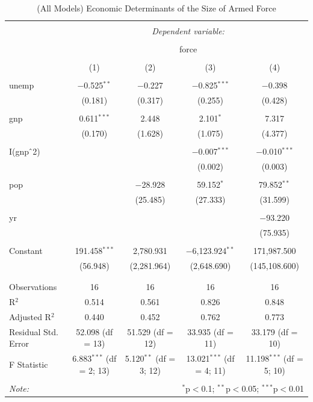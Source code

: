 \documentclass[11pt,]{article}
\begin{document}
\begin{table}[!htbp] \centering 
  \caption{(All Models) Economic Determinants of the Size of Armed Force} 
  \label{tab:arm1} 
\begin{tabular}{@{\extracolsep{5pt}}lcccc} 
\\[-1.8ex]\hline 
\hline \\[-1.8ex] 
 & \multicolumn{4}{c}{\textit{Dependent variable:}} \\ 
\cline{2-5} 
\\[-1.8ex] & \multicolumn{4}{c}{force} \\ 
\\[-1.8ex] & (1) & (2) & (3) & (4)\\ 
\hline \\[-1.8ex] 
 unemp & $-$0.525$^{**}$ & $-$0.227 & $-$0.825$^{***}$ & $-$0.398 \\ 
  & (0.181) & (0.317) & (0.255) & (0.428) \\ 
  & & & & \\ 
 gnp & 0.611$^{***}$ & 2.448 & 2.101$^{*}$ & 7.317 \\ 
  & (0.170) & (1.628) & (1.075) & (4.377) \\ 
  & & & & \\ 
 I(gnp$\hat{\mkern6mu}$2) &  &  & $-$0.007$^{***}$ & $-$0.010$^{***}$ \\ 
  &  &  & (0.002) & (0.003) \\ 
  & & & & \\ 
 pop &  & $-$28.928 & 59.152$^{*}$ & 79.852$^{**}$ \\ 
  &  & (25.485) & (27.333) & (31.599) \\ 
  & & & & \\ 
 yr &  &  &  & $-$93.220 \\ 
  &  &  &  & (75.935) \\ 
  & & & & \\ 
 Constant & 191.458$^{***}$ & 2,780.931 & $-$6,123.924$^{**}$ & 171,987.500 \\ 
  & (56.948) & (2,281.964) & (2,648.690) & (145,108.600) \\ 
  & & & & \\ 
\hline \\[-1.8ex] 
Observations & 16 & 16 & 16 & 16 \\ 
R$^{2}$ & 0.514 & 0.561 & 0.826 & 0.848 \\ 
Adjusted R$^{2}$ & 0.440 & 0.452 & 0.762 & 0.773 \\ 
Residual Std. Error & 52.098 (df = 13) & 51.529 (df = 12) & 33.935 (df = 11) & 33.179 (df = 10) \\ 
F Statistic & 6.883$^{***}$ (df = 2; 13) & 5.120$^{**}$ (df = 3; 12) & 13.021$^{***}$ (df = 4; 11) & 11.198$^{***}$ (df = 5; 10) \\ 
\hline 
\hline \\[-1.8ex] 
\textit{Note:}  & \multicolumn{4}{r}{$^{*}$p$<$0.1; $^{**}$p$<$0.05; $^{***}$p$<$0.01} \\ 
\end{tabular} 
\end{table}
\end{document}
